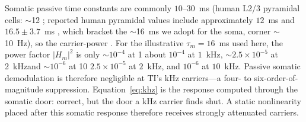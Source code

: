 \documentclass[11pt,a4paper]{article}
\providecommand{\DIFaddtex}[1]{{\protect\color{blue} \sf #1}} %
\providecommand{\DIFdeltex}[1]{{\protect\color{red} \scriptsize #1}} %
\providecommand{\DIFaddbegin}{} %
\providecommand{\DIFaddend}{} %
\providecommand{\DIFdelbegin}{} %
\providecommand{\DIFdelend}{} %
\providecommand{\DIFadd}[1]{\texorpdfstring{\DIFaddtex{#1}}{#1}} %
\providecommand{\DIFdel}[1]{\texorpdfstring{\DIFdeltex{#1}}{}} %
\begin{document}
\DIFadd{Somatic passive time constants are commonly $10$}\DIFaddend --$30$~ms\DIFdelbegin \DIFdel{(human L2/3 pyramidal
cells: $\sim$12}\DIFdelend \DIFaddbegin \DIFadd{; reported human pyramidal
values include approximately $12$}\DIFaddend ~ms \cite{deitcher2017} and $16.5\pm3.7$~ms
\cite{eyal2016}\DIFdelbegin \DIFdel{, which bracket the $\sim$16~ms we adopt for the soma, corner $\sim$10~Hz), so the carrier-power }\DIFdelend \DIFaddbegin \DIFadd{. For the illustrative $\tau_m=16$~ms used here, the power }\DIFaddend factor
$|H_m|^2$ is \DIFdelbegin \DIFdel{only $\sim 10^{-4}$ at 1}\DIFdelend \DIFaddbegin \DIFadd{about $10^{-4}$ at $1$}\DIFaddend ~kHz, \DIFdelbegin \DIFdel{$\sim 2.5\times10^{-5}$ at 2~kHzand $\sim 10^{-6}$ at 10}\DIFdelend \DIFaddbegin \DIFadd{$2.5\times10^{-5}$ at $2$~kHz, and
$10^{-6}$ at $10$}\DIFaddend ~kHz. \DIFdelbegin \DIFdel{Passive
somatic demodulation is therefore negligible at TI's kHz carriers---a four- to
six-order-of-magnitude suppression.
Equation~\eqref{eq:khz} is the response computed through the
somatic door: correct, but the door a kHz carrier finds shut.
}\DIFdelend \DIFaddbegin \DIFadd{A static nonlinearity placed after this somatic response
therefore receives strongly attenuated carriers.
}\DIFaddend

\DIFdelbegin %
\end{document}
